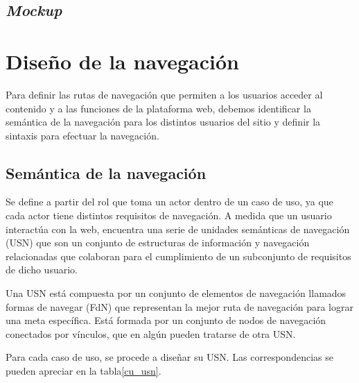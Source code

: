 \subsection{\textit{Mockup}}




\section{Diseño de la navegación}
Para definir las rutas de navegación que permiten a los usuarios acceder al contenido y a las funciones de la plataforma web, debemos identificar la semántica de la navegación para los distintos usuarios del sitio y definir la sintaxis para efectuar la navegación.


\subsection{Semántica de la navegación}
Se define a partir del rol que toma un actor dentro de un caso de uso, ya que cada actor tiene distintos requisitos de navegación. A medida que un usuario interactúa con la web, encuentra una serie de unidades semánticas de navegación (USN) que son un conjunto de estructuras de información y navegación relacionadas que colaboran para el cumplimiento de un subconjunto de requisitos de dicho usuario.


Una USN está compuesta por un conjunto de elementos de navegación llamados formas de navegar (FdN) que representan la mejor ruta de navegación para lograr una meta específica. Está formada por un conjunto de nodos de navegación conectados por vínculos, que en algún pueden tratarse de otra USN.


Para cada caso de uso, se procede a diseñar su USN. Las correspondencias se pueden apreciar en la tabla\ref{cu_usn}.


